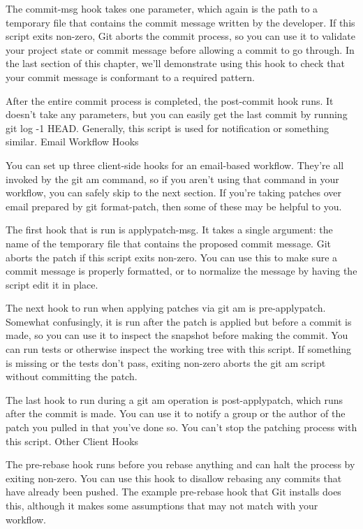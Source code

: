 The commit-msg hook takes one parameter, which again is the path to a temporary file that contains the commit message written by the developer. If this script exits non-zero, Git aborts the commit process, so you can use it to validate your project state or commit message before allowing a commit to go through. In the last section of this chapter, we’ll demonstrate using this hook to check that your commit message is conformant to a required pattern.

After the entire commit process is completed, the post-commit hook runs. It doesn’t take any parameters, but you can easily get the last commit by running git log -1 HEAD. Generally, this script is used for notification or something similar.
Email Workflow Hooks

You can set up three client-side hooks for an email-based workflow. They’re all invoked by the git am command, so if you aren’t using that command in your workflow, you can safely skip to the next section. If you’re taking patches over email prepared by git format-patch, then some of these may be helpful to you.

The first hook that is run is applypatch-msg. It takes a single argument: the name of the temporary file that contains the proposed commit message. Git aborts the patch if this script exits non-zero. You can use this to make sure a commit message is properly formatted, or to normalize the message by having the script edit it in place.

The next hook to run when applying patches via git am is pre-applypatch. Somewhat confusingly, it is run after the patch is applied but before a commit is made, so you can use it to inspect the snapshot before making the commit. You can run tests or otherwise inspect the working tree with this script. If something is missing or the tests don’t pass, exiting non-zero aborts the git am script without committing the patch.

The last hook to run during a git am operation is post-applypatch, which runs after the commit is made. You can use it to notify a group or the author of the patch you pulled in that you’ve done so. You can’t stop the patching process with this script.
Other Client Hooks

The pre-rebase hook runs before you rebase anything and can halt the process by exiting non-zero. You can use this hook to disallow rebasing any commits that have already been pushed. The example pre-rebase hook that Git installs does this, although it makes some assumptions that may not match with your workflow.

